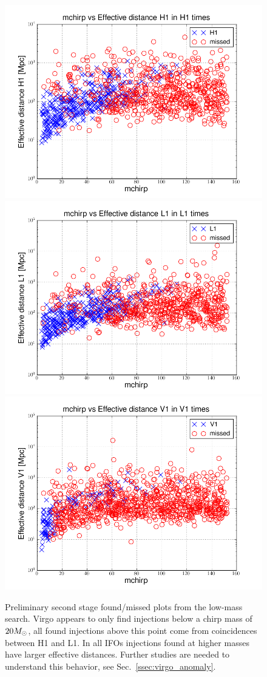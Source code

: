 \begin{figure}
  \includegraphics[width=0.5\linewidth]{figures/ninja2_results/H1-plotinspmissed_LOW_FULL_DATA_mchirp-eff_dist-log-H1-871147552-5209912} 
  \includegraphics[width=0.5\linewidth]{figures/ninja2_results/L1-plotinspmissed_LOW_FULL_DATA_mchirp-eff_dist-log-L1-871147552-5209912} \\
  \includegraphics[width=0.5\linewidth]{figures/ninja2_results/V1-plotinspmissed_LOW_FULL_DATA_mchirp-eff_dist-log-V1-871147552-5209912} \\
  \caption[Second stage found/missed plots from the low-mass search]{
  \label{f:ninja2_cbc_results_low_second}
Preliminary second stage found/missed plots from
the low-mass search.  Virgo appears to only find injections below a
chirp mass of $20 M_\odot$, all found injections above this point come
from coincidences between H1 and L1.  In all IFOs injections found at
higher masses have larger effective distances.  Further studies are
needed to understand this behavior, see
Sec.~\ref{ssec:virgo_anomaly}.
}
\end{figure}%

